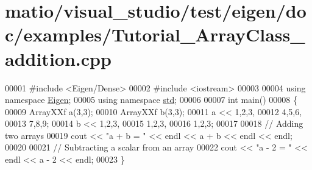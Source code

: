 \hypertarget{matio_2visual__studio_2test_2eigen_2doc_2examples_2_tutorial___array_class__addition_8cpp_source}{}\section{matio/visual\+\_\+studio/test/eigen/doc/examples/\+Tutorial\+\_\+\+Array\+Class\+\_\+addition.cpp}
\label{matio_2visual__studio_2test_2eigen_2doc_2examples_2_tutorial___array_class__addition_8cpp_source}

\begin{DoxyCode}
00001 \textcolor{preprocessor}{#include <Eigen/Dense>}
00002 \textcolor{preprocessor}{#include <iostream>}
00003 
00004 \textcolor{keyword}{using namespace }\hyperlink{namespace_eigen}{Eigen};
00005 \textcolor{keyword}{using namespace }\hyperlink{namespacestd}{std};
00006 
00007 \textcolor{keywordtype}{int} main()
00008 \{
00009   ArrayXXf a(3,3);
00010   ArrayXXf b(3,3);
00011   a << 1,2,3,
00012        4,5,6,
00013        7,8,9;
00014   b << 1,2,3,
00015        1,2,3,
00016        1,2,3;
00017        
00018   \textcolor{comment}{// Adding two arrays}
00019   cout << \textcolor{stringliteral}{"a + b = "} << endl << a + b << endl << endl;
00020 
00021   \textcolor{comment}{// Subtracting a scalar from an array}
00022   cout << \textcolor{stringliteral}{"a - 2 = "} << endl << a - 2 << endl;
00023 \}
\end{DoxyCode}
